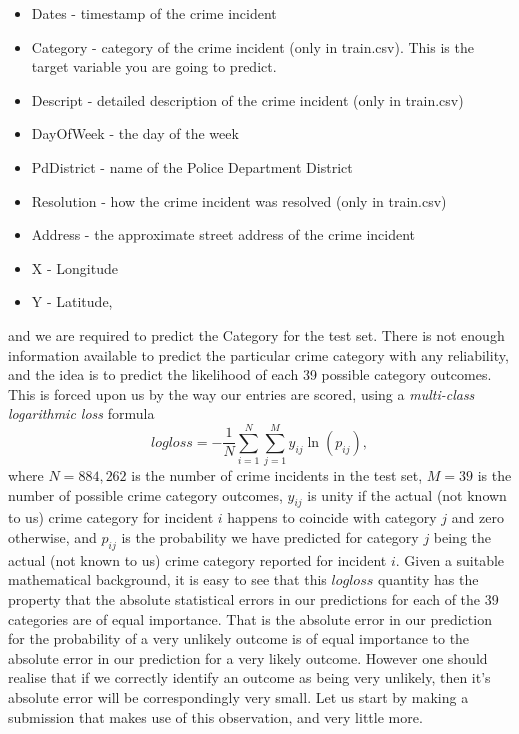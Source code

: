 \documentclass[12pt,notitlepage]{article}
\begin{document}
\begin{itemize}
\item Dates - timestamp of the crime incident
\item Category - category of the crime incident (only in train.csv). This is the target variable you are going to predict.
\item Descript - detailed description of the crime incident (only in train.csv)
\item DayOfWeek - the day of the week
\item PdDistrict - name of the Police Department District
\item Resolution - how the crime incident was resolved (only in train.csv)
\item Address - the approximate street address of the crime incident 
\item X - Longitude
\item Y - Latitude,
\end{itemize}
%
and we are required to predict the Category for the test set. There is not enough information available to predict the particular crime category with any reliability, and the idea is to predict the likelihood of each 39 possible category outcomes. This is forced upon us by the way our entries are scored, using a \emph{multi-class logarithmic loss} formula
%
\begin{equation}
logloss = -\frac{1}{N}\sum_{i=1}^N \sum_{j=1}^M y_{ij} \ln(p_{ij}),\label{eq:logloss}
\end{equation}
%
where $N=884,262$ is the number of crime incidents in the test set, $M=39$ is the number of possible crime category outcomes, $y_{ij}$ is unity if the actual (not known to us) crime category for incident $i$ happens to coincide with category $j$ and zero otherwise, and $p_{ij}$ is the probability we have predicted for category $j$ being the actual (not known to us) crime category reported for incident $i$. Given a suitable mathematical background, it is easy to see that this $logloss$ quantity has the property that the absolute statistical errors in our predictions for each of the 39 categories are of equal importance. That is the absolute error in our prediction for the probability of a very unlikely outcome is of equal importance to the absolute error in our prediction for a very likely outcome. However one should realise that if we correctly identify an outcome as being very unlikely, then it's absolute error will be correspondingly very small. Let us start by making a submission that makes use of this observation, and very little more.
\end{document}
